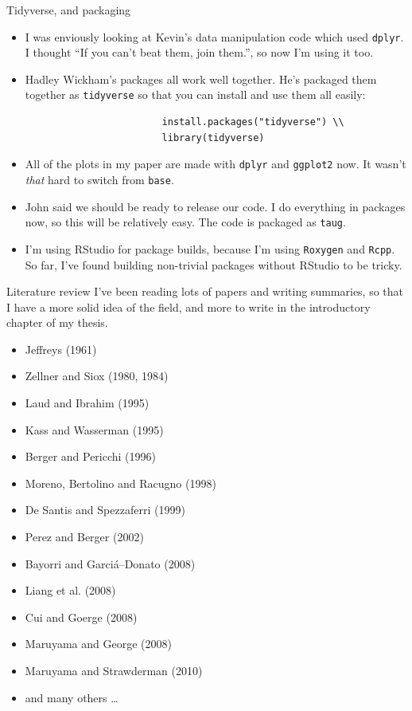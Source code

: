\documentclass{beamer}
\begin{document}
\begin{frame}{Tidyverse, and packaging}
	\begin{itemize}
		\item I was enviously looking at Kevin's data manipulation code which used \texttt{dplyr}. I thought
		      ``If you can't beat them, join them.'', so now I'm using it too.
		\item Hadley Wickham's packages all work well together. He's packaged them together as \texttt{tidyverse} so
		      that you can install and use them all easily:
		      \begin{verbatim}
						install.packages("tidyverse") \\
						library(tidyverse)
		\end{verbatim}
		\item All of the plots in my paper are made with \texttt{dplyr} and \texttt{ggplot2} now. It wasn't \emph{that}
		      hard to switch from \texttt{base}.
		\item John said we should be ready to release our code. I do everything in packages now, so this
		      will be relatively easy. The code is packaged as \texttt{taug}.
		\item I'm using RStudio for package builds, because I'm using \texttt{Roxygen} and \texttt{Rcpp}. So far, I've
		      found building non-trivial packages without RStudio to be tricky.
	\end{itemize}
\end{frame}

\begin{frame}{Literature review}
	I've been reading lots of papers and writing summaries, so that I have a more solid idea of the field, and
	more to write in the introductory chapter of my thesis.
	\tiny
	\begin{itemize}
		\item Jeffreys (1961)
		\item Zellner and Siox (1980, 1984)
		\item Laud and Ibrahim (1995)
		\item Kass and Wasserman (1995)
		\item Berger and Pericchi (1996)
		\item Moreno, Bertolino and Racugno (1998)
		\item De Santis and Spezzaferri (1999)
		\item Perez and Berger (2002)
		\item Bayorri and Garci\'{a}--Donato (2008)
		\item Liang et al. (2008)
		\item Cui and Goerge (2008)
		\item Maruyama and George (2008)
		\item Maruyama and Strawderman (2010)
		\item and many others \ldots
	\end{itemize}
	\small
\end{frame}
\end{document}
